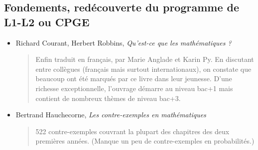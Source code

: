 \documentclass{article}
\begin{document}
\subsection{Fondements, redécouverte du programme de L1-L2 ou CPGE}
\begin{mdframed}
\begin{itemize}
\item Richard Courant, Herbert Robbins, \emph{Qu'est-ce que les mathématiques ?}
\begin{quote}
Enfin traduit en français, par Marie Anglade et Karin Py. En discutant entre collègues (français mais surtout internationaux), on constate que beaucoup ont été marqués par ce livre dans leur jeunesse. D'une richesse exceptionnelle, l'ouvrage démarre au niveau bac+1 mais contient de nombreux thèmes de  niveau bac+3.%
\end{quote}
\item Bertrand Hauchecorne, \emph{Les contre-exemples en mathématiques}
\begin{quote}
522 contre-exemples couvrant la plupart des chapitres des deux premières années. (Manque un peu de contre-exemples en probabilités.)
\end{quote}
\end{itemize}
\end{mdframed}
\end{document}
